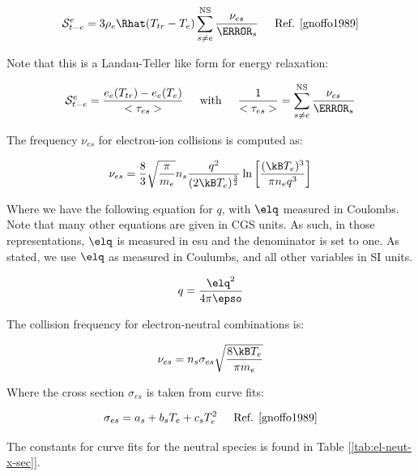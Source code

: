 \documentclass[10pt]{article}
\begin{document}
\begin{flushleft}
\begin{equation*}
    \mathcal{S}_{t-e}^e = 3 \rho_e  \Rhat (T_{tr} - T_e) \sum_{s \neq e}^\text{NS} \frac{\nu_{es}}{\MW_s} \hspace{5mm} \text{Ref. \cite{gnoffo1989}}
\end{equation*}

Note that this is a Landau-Teller like form for energy relaxation:

\begin{equation*}
    \mathcal{S}_{t-e}^e = \frac{e_e(T_{tr}) - e_e(T_e)}{<\tau_{es}>} \hspace{5mm} \text{with} \hspace{5mm} \frac{1}{<\tau_{es}>} = \sum_{s \neq e} ^\text{NS} \frac{\nu_{es}}{\MW_s}
\end{equation*}

The frequency $\nu_{es}$ for electron-ion collisions is computed as:

\begin{equation*}
    \nu_{es} = \frac{8}{3} \sqrt{\frac{\pi}{m_e}} n_s \frac{q^2}{(2 \kB T_e)^\frac{3}{2}} \ln \bb{\frac{(\kB T_e)^3}{\pi n_e q^3}}
\end{equation*}

Where we have the following equation for $q$, with $\elq$ measured in Coulombs. Note that many other equations are given in CGS units. As such, in those representations, $\elq$ is measured in esu and the denominator is set to one. As stated, we use $\elq$ as measured in Coulumbs, and all other variables in SI units.

\begin{equation*}
    q = \frac{\elq^2}{4 \pi \epso}
\end{equation*}

The collision frequency for electron-neutral combinations is:

\begin{equation*}
    \nu_{es} = n_s \sigma_{es} \sqrt{\frac{8 \kB T_e}{\pi m_e}}
\end{equation*}

Where the cross section $\sigma_{es}$ is taken from curve fits:

\begin{equation*}
    \sigma_{es} = a_s + b_s T_e + c_s T_e^2 \hspace{5mm} \text{Ref. \cite{gnoffo1989}}
\end{equation*}

The constants for curve fits for the neutral species is found in Table [\ref{tab:el-neut-x-sec}].


\end{flushleft}
\end{document}
